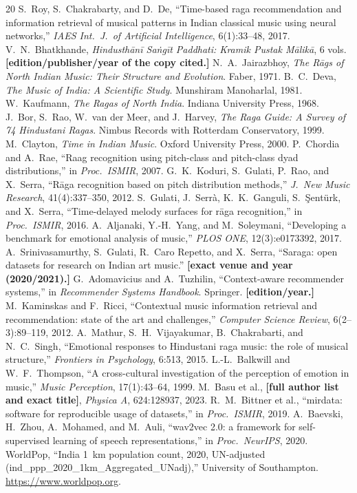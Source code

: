 \documentclass[11pt]{article}
\newcommand{\todo}[1]{\textbf{[#1]}}
\begin{document}
\begin{thebibliography}{20}
 S.~Roy, S.~Chakrabarty, and D.~De, ``Time-based raga
recommendation and information retrieval of musical patterns in Indian
classical music using neural networks,'' \emph{IAES Int.\ J.\ of Artificial
Intelligence}, 6(1):33--48, 2017.
 V.~N.~Bhatkhande, \emph{Hindusth\=an\=i Sa\.ng\=it
Paddhati: Kramik Pustak M\=alik\=a}, 6 vols. \todo{edition/publisher/year of
the copy cited.}
 N.~A.~Jairazbhoy, \emph{The R\=ags of North Indian
Music: Their Structure and Evolution}. Faber, 1971.
 B.~C.~Deva, \emph{The Music of India: A Scientific Study}.
Munshiram Manoharlal, 1981.
 W.~Kaufmann, \emph{The Ragas of North India}. Indiana
University Press, 1968.
 J.~Bor, S.~Rao, W.~van der Meer, and J.~Harvey,
\emph{The Raga Guide: A Survey of 74 Hindustani Ragas}. Nimbus Records with
Rotterdam Conservatory, 1999.
 M.~Clayton, \emph{Time in Indian Music}. Oxford University
Press, 2000.
 P.~Chordia and A.~Rae, ``Raag recognition using
pitch-class and pitch-class dyad distributions,'' in \emph{Proc.\ ISMIR},
2007.
 G.~K.~Koduri, S.~Gulati, P.~Rao, and X.~Serra,
``R\=aga recognition based on pitch distribution methods,'' \emph{J.\ New
Music Research}, 41(4):337--350, 2012.
 S.~Gulati, J.~Serr\`a, K.~K.~Ganguli, S.~\c{S}ent\"urk,
and X.~Serra, ``Time-delayed melody surfaces for r\=aga recognition,'' in
\emph{Proc.\ ISMIR}, 2016.
 A.~Aljanaki, Y.-H.~Yang, and M.~Soleymani, ``Developing a
benchmark for emotional analysis of music,'' \emph{PLOS ONE},
12(3):e0173392, 2017.
 A.~Srinivasamurthy, S.~Gulati, R.~Caro Repetto, and
X.~Serra, ``Saraga: open datasets for research on Indian art music.''
\todo{exact venue and year (2020/2021).}
 G.~Adomavicius and A.~Tuzhilin, ``Context-aware
recommender systems,'' in \emph{Recommender Systems Handbook}. Springer.
\todo{edition/year.}
 M.~Kaminskas and F.~Ricci, ``Contextual music
information retrieval and recommendation: state of the art and challenges,''
\emph{Computer Science Review}, 6(2--3):89--119, 2012.
 A.~Mathur, S.~H.~Vijayakumar, B.~Chakrabarti, and
N.~C.~Singh, ``Emotional responses to Hindustani raga music: the role of
musical structure,'' \emph{Frontiers in Psychology}, 6:513, 2015.
 L.-L.~Balkwill and W.~F.~Thompson, ``A cross-cultural
investigation of the perception of emotion in music,'' \emph{Music
Perception}, 17(1):43--64, 1999.
 M.~Basu et al., \todo{full author list and exact title},
\emph{Physica A}, 624:128937, 2023.
 R.~M.~Bittner et al., ``mirdata: software for reproducible
usage of datasets,'' in \emph{Proc.\ ISMIR}, 2019.
 A.~Baevski, H.~Zhou, A.~Mohamed, and M.~Auli, ``wav2vec
2.0: a framework for self-supervised learning of speech representations,''
in \emph{Proc.\ NeurIPS}, 2020.
 WorldPop, ``India 1~km population count, 2020,
UN-adjusted (ind\_ppp\_2020\_1km\_Aggregated\_UNadj),'' University of
Southampton. \url{https://www.worldpop.org}.
\end{thebibliography}
\end{document}
